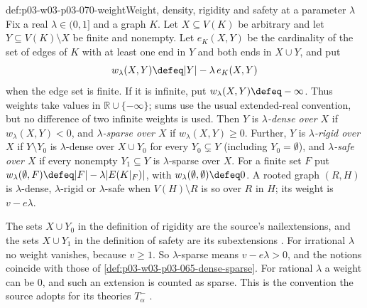 \begin{hbdefinition}{def:p03-w03-p03-070-weight}{Weight, density, rigidity and safety at a parameter \(\lambda\)}
Fix a real \(\lambda\in(0,1]\) and a graph \(K\).  Let \(X\subseteq V(K)\)
be arbitrary and let \(Y\subseteq V(K)\setminus X\) be finite and nonempty.
Let \(e_K(X,Y)\) be the cardinality of the set of edges of \(K\) with at
least one end in \(Y\) and both ends in \(X\cup Y\), and put
\[
  w_\lambda(X,Y)\defeq|Y|-\lambda\,e_K(X,Y)
\]
when the edge set is finite.  If it is infinite, put
\(w_\lambda(X,Y)\defeq-\infty\).  Thus weights take values in
\(\mathbb R\cup\{-\infty\}\); sums use the usual extended-real convention,
but no difference of two infinite weights is used.
Then \(Y\) is \emph{\(\lambda\)-dense over \(X\)} if \(w_\lambda(X,Y)<0\), and
\emph{\(\lambda\)-sparse over \(X\)} if \(w_\lambda(X,Y)\geq0\).  Further,
\(Y\) is \emph{\(\lambda\)-rigid over \(X\)} if \(Y\setminus Y_0\) is
\(\lambda\)-dense over \(X\cup Y_0\) for every \(Y_0\subsetneq Y\) (including
\(Y_0=\emptyset\)), and \emph{\(\lambda\)-safe over \(X\)} if every nonempty
\(Y_1\subseteq Y\) is \(\lambda\)-sparse over \(X\).  For a finite set \(F\)
put \(w_\lambda(\emptyset,F)\defeq|F|-\lambda|E(K|_F)|\), with
\(w_\lambda(\emptyset,\emptyset)\defeq0\).  A rooted graph \((R,H)\) is
\(\lambda\)-dense, \(\lambda\)-rigid or \(\lambda\)-safe when
\(V(H)\setminus R\) is so over \(R\) in \(H\); its weight is \(v-e\lambda\).
\end{hbdefinition}

The sets \(X\cup Y_0\) in the definition of rigidity are the source's
nailextensions, and the sets \(X\cup Y_1\) in the definition of safety are
its subextensions \cite[pp.~6--7]{Spencer2007LogicRandomStructuresAuthor}.
For irrational \(\lambda\) no weight vanishes, because \(v\geq1\).  So
\(\lambda\)-sparse means \(v-e\lambda>0\), and the notions coincide with those
of \cref{def:p03-w03-p03-065-dense-sparse}.  For rational \(\lambda\) a weight
can be \(0\), and such an extension is counted as sparse.  This is the
convention the source adopts for its theories \(T^-_\alpha\)
\cite[p.~19]{Spencer2007LogicRandomStructuresAuthor}.

